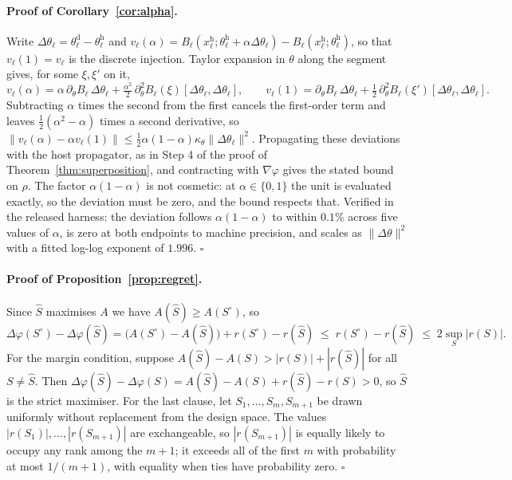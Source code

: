 \documentclass[10pt]{article}
\theoremstyle{plain}
\theoremstyle{definition}
\theoremstyle{remark}
\newcommand{\host}{\mathrm{h}}
\newcommand{\donor}{\mathrm{d}}
\begin{document}
\paragraph{Proof of Corollary~\ref{cor:alpha}.}
Write $\Delta\theta_\ell=\theta^{\donor}_\ell-\theta^{\host}_\ell$ and
$v_\ell(\alpha)=B_\ell(x^{\host}_\ell;\theta^{\host}_\ell+\alpha\Delta\theta_\ell)-B_\ell(x^{\host}_\ell;\theta^{\host}_\ell)$,
so that $v_\ell(1)=v_\ell$ is the discrete injection. Taylor expansion in $\theta$
along the segment gives, for some $\xi,\xi'$ on it,
\[
v_\ell(\alpha)=\alpha\,\partial_\theta B_\ell\,\Delta\theta_\ell+\tfrac{\alpha^2}{2}\,\partial^2_\theta B_\ell(\xi)[\Delta\theta_\ell,\Delta\theta_\ell],
\qquad
v_\ell(1)=\partial_\theta B_\ell\,\Delta\theta_\ell+\tfrac{1}{2}\,\partial^2_\theta B_\ell(\xi')[\Delta\theta_\ell,\Delta\theta_\ell].
\]
Subtracting $\alpha$ times the second from the first cancels the first-order term
and leaves $\tfrac{1}{2}(\alpha^2-\alpha)$ times a second derivative, so
$\|v_\ell(\alpha)-\alpha v_\ell(1)\|\le\tfrac{1}{2}\alpha(1-\alpha)\kappa_\theta\|\Delta\theta_\ell\|^2$.
Propagating these deviations with the host propagator, as in Step 4 of the proof
of Theorem~\ref{thm:superposition}, and contracting with $\nabla\varphi$ gives the
stated bound on $\rho$. The factor $\alpha(1-\alpha)$ is not cosmetic: at
$\alpha\in\{0,1\}$ the unit is evaluated exactly, so the deviation must be zero,
and the bound respects that. Verified in the released harness: the deviation
follows $\alpha(1-\alpha)$ to within $0.1\%$ across five values of $\alpha$, is
zero at both endpoints to machine precision, and scales as $\|\Delta\theta\|^{2}$
with a fitted log-log exponent of $1.996$. \hfill$\square$

\paragraph{Proof of Proposition~\ref{prop:regret}.}
Since $\widehat{S}$ maximises $A$ we have $A(\widehat{S})\ge A(S^{\circ})$, so
\[
\Delta\varphi(S^{\circ})-\Delta\varphi(\widehat{S})
= \big(A(S^{\circ})-A(\widehat{S})\big) + r(S^{\circ}) - r(\widehat{S})
\;\le\; r(S^{\circ}) - r(\widehat{S}) \;\le\; 2\sup_S|r(S)| .
\]
For the margin condition, suppose $A(\widehat{S})-A(S)>|r(S)|+|r(\widehat{S})|$
for all $S\neq\widehat{S}$. Then
$\Delta\varphi(\widehat S)-\Delta\varphi(S) = A(\widehat S)-A(S) + r(\widehat S)-r(S) > 0$,
so $\widehat S$ is the strict maximiser. For the last clause, let
$S_1,\dots,S_m,S_{m+1}$ be drawn uniformly without replacement from the design
space. The values $|r(S_1)|,\dots,|r(S_{m+1})|$ are exchangeable, so
$|r(S_{m+1})|$ is equally likely to occupy any rank among the $m+1$; it exceeds
all of the first $m$ with probability at most $1/(m+1)$, with equality when ties
have probability zero. \hfill$\square$
\end{document}
